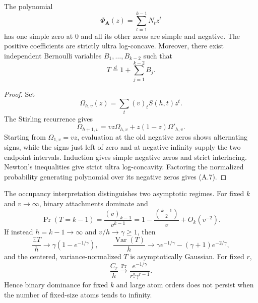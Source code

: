 \begin{theorem}
\label{theorem-real-rooted-attachment-polynomial}
The polynomial
\[
\Phi_{\mathbf A}(z)=\sum_{t=1}^{k-1}N_tz^t
\]
has one simple zero at $0$ and all its other zeros are simple and negative.
The positive coefficients are strictly ultra log-concave.  Moreover, there
exist independent Bernoulli variables $B_1,\ldots,B_{k-2}$ such that
\[
T\stackrel d=1+\sum_{j=1}^{k-2}B_j.
\tag{A.7}
\]
\end{theorem}
\begin{proof}
Set
\[
\Omega_{h,v}(z)=\sum_t(v)_tS(h,t)z^t.
\]
The Stirling recurrence gives
\[
\Omega_{h+1,v}=vz\Omega_{h,v}+z(1-z)\Omega'_{h,v}.
\tag{A.8}
\]
Starting from $\Omega_{1,v}=vz$, evaluation at the old negative zeros shows
alternating signs, while the signs just left of zero and at negative infinity
supply the two endpoint intervals.  Induction gives simple negative zeros and
strict interlacing.  Newton's inequalities give strict ultra log-concavity.
Factoring the normalized probability generating polynomial over its negative
zeros gives (A.7).
\end{proof}

The occupancy interpretation distinguishes two asymptotic regimes.  For fixed
$k$ and $v\to\infty$, binary attachments dominate and
\[
\Pr(T=k-1)=\frac{(v)_{k-1}}{v^{k-1}}
=1-\frac{\binom{k-1}{2}}v+O_k(v^{-2}).
\tag{A.9}
\]
If instead $h=k-1\to\infty$ and $v/h\to\gamma\ge1$, then
\[
\frac{\mathbb ET}{h}\to\gamma(1-e^{-1/\gamma}),
\qquad
\frac{\operatorname{Var}(T)}h
\to\gamma e^{-1/\gamma}-(\gamma+1)e^{-2/\gamma},
\tag{A.10}
\]
and the centered, variance-normalized $T$ is asymptotically Gaussian.  For
fixed $r$,
\[
\frac{C_r}{h}
\xrightarrow{\Pr}
\frac{e^{-1/\gamma}}{r!\gamma^{r-1}}.
\tag{A.11}
\]
Hence binary dominance for fixed $k$ and large atom orders does not persist
when the number of fixed-size atoms tends to infinity.
